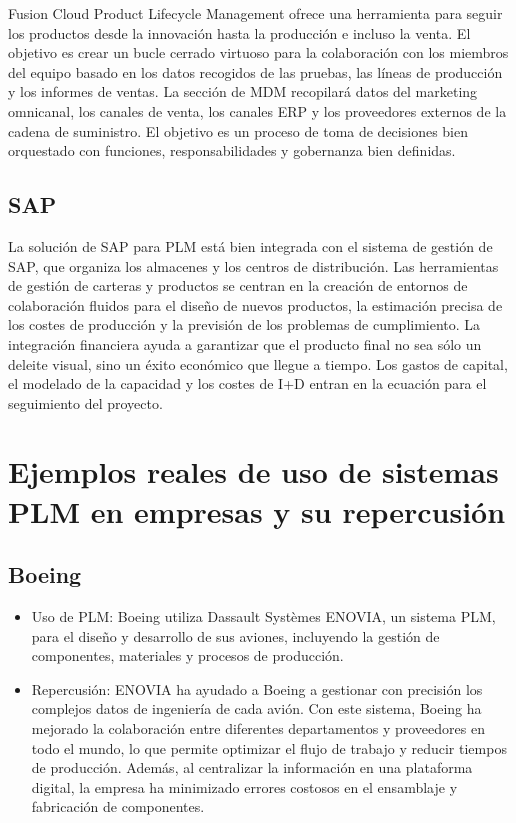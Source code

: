 \documentclass[12pt]{article}
\begin{document}
Fusion Cloud Product Lifecycle Management ofrece una herramienta para seguir los productos desde la innovación hasta la producción e incluso la venta. El objetivo es crear un bucle cerrado 
virtuoso para la colaboración con los miembros del equipo basado en los datos recogidos de las pruebas, las líneas de producción y los informes de ventas. La sección de MDM recopilará datos 
del marketing omnicanal, los canales de venta, los canales ERP y los proveedores externos de la cadena de suministro. El objetivo es un proceso de toma de decisiones bien orquestado con funciones, 
responsabilidades y gobernanza bien definidas.

\subsection{SAP}

La solución de SAP para PLM está bien integrada con el sistema de gestión de SAP, que organiza los almacenes y los centros de distribución. Las herramientas de gestión de carteras y 
productos se centran en la creación de entornos de colaboración fluidos para el diseño de nuevos productos, la estimación precisa de los costes de producción y la previsión de los problemas de 
cumplimiento. La integración financiera ayuda a garantizar que el producto final no sea sólo un deleite visual, sino un éxito económico que llegue a tiempo. Los gastos de capital, el modelado de 
la capacidad y los costes de I+D entran en la ecuación para el seguimiento del proyecto.

\section{Ejemplos reales de uso de sistemas PLM en empresas y su repercusión}

\subsection{Boeing}
\begin{itemize}
    \item Uso de PLM: Boeing utiliza Dassault Systèmes ENOVIA, un sistema PLM, para el diseño y desarrollo de sus aviones, incluyendo la gestión de componentes, 
    materiales y procesos de producción.
    \item Repercusión: ENOVIA ha ayudado a Boeing a gestionar con precisión los complejos datos de ingeniería de cada avión. Con este sistema, 
    Boeing ha mejorado la colaboración entre diferentes departamentos y proveedores en todo el mundo, lo que permite optimizar el flujo de trabajo y 
    reducir tiempos de producción. Además, al centralizar la información en una plataforma digital, la empresa ha minimizado errores costosos en el 
    ensamblaje y fabricación de componentes.
\end{itemize}
\end{document}
